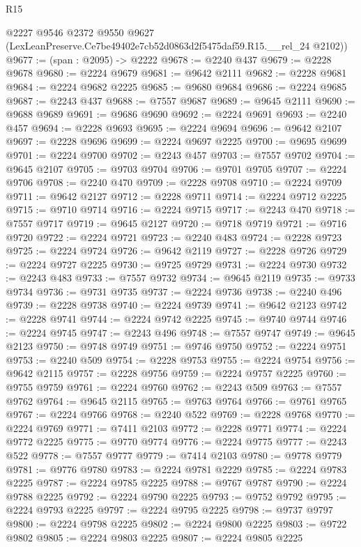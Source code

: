 \begin{lexlean}{R15}
\begin{coremodule}
      @2227
      @9546
      @2372
      @9550
      @9627
      (LexLeanPreserve.Ce7be49402e7cb52d0863d2f5475daf59.R15.__rel_24 @2102))
@9677 := (span : @2095) -> @2222
@9678 := @2240 @437
@9679 := @2228 @9678
@9680 := @2224 @9679
@9681 := @9642 @2111
@9682 := @2228 @9681
@9684 := @2224 @9682 @2225
@9685 := @9680 @9684
@9686 := @2224 @9685
@9687 := @2243 @437
@9688 := @7557 @9687
@9689 := @9645 @2111
@9690 := @9688 @9689
@9691 := @9686 @9690
@9692 := @2224 @9691
@9693 := @2240 @457
@9694 := @2228 @9693
@9695 := @2224 @9694
@9696 := @9642 @2107
@9697 := @2228 @9696
@9699 := @2224 @9697 @2225
@9700 := @9695 @9699
@9701 := @2224 @9700
@9702 := @2243 @457
@9703 := @7557 @9702
@9704 := @9645 @2107
@9705 := @9703 @9704
@9706 := @9701 @9705
@9707 := @2224 @9706
@9708 := @2240 @470
@9709 := @2228 @9708
@9710 := @2224 @9709
@9711 := @9642 @2127
@9712 := @2228 @9711
@9714 := @2224 @9712 @2225
@9715 := @9710 @9714
@9716 := @2224 @9715
@9717 := @2243 @470
@9718 := @7557 @9717
@9719 := @9645 @2127
@9720 := @9718 @9719
@9721 := @9716 @9720
@9722 := @2224 @9721
@9723 := @2240 @483
@9724 := @2228 @9723
@9725 := @2224 @9724
@9726 := @9642 @2119
@9727 := @2228 @9726
@9729 := @2224 @9727 @2225
@9730 := @9725 @9729
@9731 := @2224 @9730
@9732 := @2243 @483
@9733 := @7557 @9732
@9734 := @9645 @2119
@9735 := @9733 @9734
@9736 := @9731 @9735
@9737 := @2224 @9736
@9738 := @2240 @496
@9739 := @2228 @9738
@9740 := @2224 @9739
@9741 := @9642 @2123
@9742 := @2228 @9741
@9744 := @2224 @9742 @2225
@9745 := @9740 @9744
@9746 := @2224 @9745
@9747 := @2243 @496
@9748 := @7557 @9747
@9749 := @9645 @2123
@9750 := @9748 @9749
@9751 := @9746 @9750
@9752 := @2224 @9751
@9753 := @2240 @509
@9754 := @2228 @9753
@9755 := @2224 @9754
@9756 := @9642 @2115
@9757 := @2228 @9756
@9759 := @2224 @9757 @2225
@9760 := @9755 @9759
@9761 := @2224 @9760
@9762 := @2243 @509
@9763 := @7557 @9762
@9764 := @9645 @2115
@9765 := @9763 @9764
@9766 := @9761 @9765
@9767 := @2224 @9766
@9768 := @2240 @522
@9769 := @2228 @9768
@9770 := @2224 @9769
@9771 := @7411 @2103
@9772 := @2228 @9771
@9774 := @2224 @9772 @2225
@9775 := @9770 @9774
@9776 := @2224 @9775
@9777 := @2243 @522
@9778 := @7557 @9777
@9779 := @7414 @2103
@9780 := @9778 @9779
@9781 := @9776 @9780
@9783 := @2224 @9781 @2229
@9785 := @2224 @9783 @2225
@9787 := @2224 @9785 @2225
@9788 := @9767 @9787
@9790 := @2224 @9788 @2225
@9792 := @2224 @9790 @2225
@9793 := @9752 @9792
@9795 := @2224 @9793 @2225
@9797 := @2224 @9795 @2225
@9798 := @9737 @9797
@9800 := @2224 @9798 @2225
@9802 := @2224 @9800 @2225
@9803 := @9722 @9802
@9805 := @2224 @9803 @2225
@9807 := @2224 @9805 @2225

\end{coremodule}
\end{lexlean}
